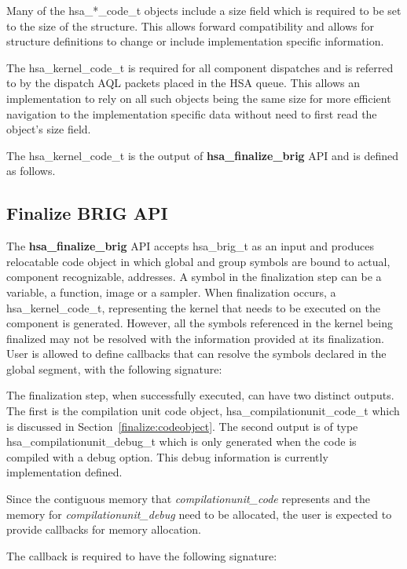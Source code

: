 \documentclass[draft]{book}
\newcommand{\reffun}[1]{\textbf{#1}}
\newcommand{\reftyp}[1]{#1}
\begin{document}
\begin{appendices}
Many of the \reftyp{hsa_*_code_t} objects include a size field which is
required to be set to the size of the structure. This allows forward
compatibility and allows for structure definitions to change or include
implementation specific information.

The \reftyp{hsa_kernel_code_t} is required for all component dispatches and
is referred to by the dispatch AQL packets placed in the HSA queue. This allows
an implementation to rely on all such objects being the same size for more
efficient navigation to the implementation specific data without need to first
read the object's size field.

The \reftyp{hsa_kernel_code_t} is the output of
\reffun{hsa_finalize_brig} API and is defined as follows.



\subsection{Finalize BRIG API}
The \reffun{hsa_finalize_brig} API accepts \reftyp{hsa_brig_t} as an input
and produces relocatable code object in which global and group symbols are bound
to actual, component recognizable, addresses. A symbol in the finalization step
can be a variable, a function, image or a sampler. When finalization occurs, a
\reftyp{hsa_kernel_code_t}, representing the kernel that needs to be executed
on the component is generated. However, all the symbols referenced in the
kernel being finalized may not be resolved with the information provided at its
finalization. User is allowed to define callbacks that can resolve the symbols
declared in the global segment, with the following signature:


The finalization step, when successfully executed, can have two distinct
outputs. The first is the compilation unit code object,
\reftyp{hsa_compilationunit_code_t} which is discussed in
Section~\ref{finalize:codeobject}. The second output is of type
\reftyp{hsa_compilationunit_debug_t} which is only generated when the code is
compiled with a debug option. This debug information is currently implementation
defined.

Since the contiguous memory that {\itshape compilationunit_code} represents and
the memory for {\itshape compilationunit_debug} need to be allocated, the user
is expected to provide callbacks for memory allocation.

The callback is required to have the following signature:



\end{appendices}
\end{document}
